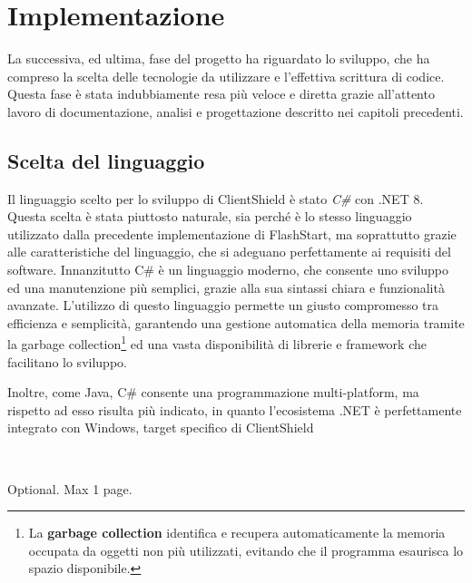 \documentclass[12pt,a4paper,openright,twoside]{book}
\begin{document}

\chapter{Implementazione}

La successiva, ed ultima, fase del progetto ha riguardato lo sviluppo, che ha compreso la scelta delle tecnologie da utilizzare e l'effettiva scrittura di codice.
Questa fase è stata indubbiamente resa più veloce e diretta grazie all'attento lavoro di documentazione, analisi e progettazione descritto nei capitoli precedenti.

\section{Scelta del linguaggio}

Il linguaggio scelto per lo sviluppo di ClientShield è stato \textit{C\#} con .NET 8.
Questa scelta è stata piuttosto naturale, sia perché è lo stesso linguaggio utilizzato dalla precedente implementazione di FlashStart, ma soprattutto grazie alle caratteristiche del linguaggio, che si adeguano perfettamente ai requisiti del software.
Innanzitutto C\# è un linguaggio moderno, che consente uno sviluppo ed una manutenzione più semplici, grazie alla sua sintassi chiara e funzionalità avanzate.
L'utilizzo di questo linguaggio permette un giusto compromesso tra efficienza e semplicità, garantendo una gestione automatica della memoria tramite la garbage collection\footnote{La \textbf{garbage collection} identifica e recupera automaticamente la memoria occupata da oggetti non più utilizzati, evitando che il programma esaurisca lo spazio disponibile.} ed una vasta disponibilità di librerie e framework che facilitano lo sviluppo.

Inoltre, come Java, C# consente una programmazione multi-platform, ma rispetto ad esso risulta più indicato, in quanto l'ecosistema .NET è perfettamente integrato con Windows, target specifico di ClientShield




\backmatter\




\begin{acknowledgements} %
Optional. Max 1 page.
\end{acknowledgements}
\end{document}
